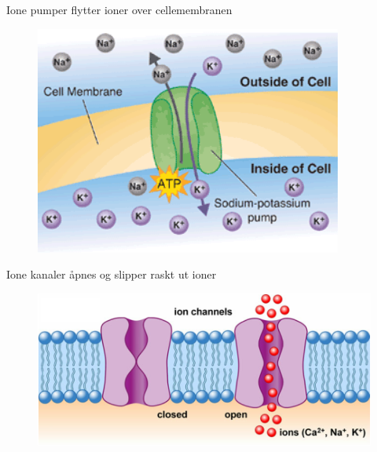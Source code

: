 \documentclass[presentation]{beamer}
\begin{document}
\begin{frame}{Ione pumper flytter ioner over cellemembranen}
   \begin{figure}
       {\includegraphics[width=0.9\textwidth]{ion_pump.png}}
\end{figure}
\end{frame}



\begin{frame}{Ione kanaler åpnes og slipper raskt ut ioner}
   \begin{figure}
       {\includegraphics[width=1\textwidth]{ion_channel.png}}
\end{figure}
\end{frame}
\end{document}
